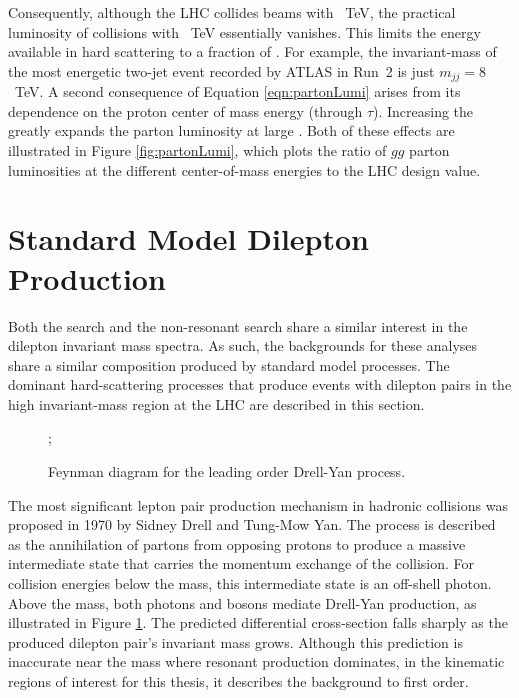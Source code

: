 Consequently, although the LHC collides beams with ~TeV, the practical luminosity of collisions with ~TeV essentially vanishes.
This limits the energy available in hard scattering to a fraction of \sqrts.
For example, the invariant-mass of the most energetic two-jet event recorded by ATLAS in Run~2 is just $m_{jj}=8$~TeV.
A second consequence of Equation \ref{eqn:partonLumi} arises from its dependence on the proton center of mass energy \sqrts (through $\tau$).
Increasing the \sqrts greatly expands the parton luminosity at large \sqrths.
Both of these effects are illustrated in Figure \ref{fig:partonLumi}, which plots the ratio of $gg$ parton luminosities at the different center-of-mass energies to the LHC design value.

\section{Standard Model Dilepton Production}\label{sec:phenoBkg}

Both the \hmm search and the non-resonant search share a similar interest in the dilepton invariant mass spectra.
As such, the backgrounds for these analyses share a similar composition produced by standard model processes.
The dominant hard-scattering processes that produce events with dilepton pairs in the high invariant-mass region at the LHC are described in this section.

\begin{figure}[h!]
\captionsetup[subfigure]{position=b}
\centering
    ; \\ [1em]
\caption{Feynman diagram for the leading order Drell-Yan process.}
\label{fig:phenoDy}
\end{figure}

The most significant lepton pair production mechanism in hadronic collisions was proposed in 1970 by Sidney Drell and Tung-Mow Yan. 
The process is described as the annihilation of partons from opposing protons to produce a massive intermediate state that carries the momentum exchange of the collision. \cite{drellYan}
For collision energies below the \Z mass, this intermediate state is an off-shell photon.
Above the \Z mass, both photons and \Z bosons mediate Drell-Yan production, as illustrated in Figure \ref{fig:phenoDy}.
The predicted differential cross-section falls sharply as the produced dilepton pair's invariant mass grows.
Although this prediction is inaccurate near the \Z mass where resonant production dominates, in the kinematic regions of interest for this thesis, it describes the background to first order.

